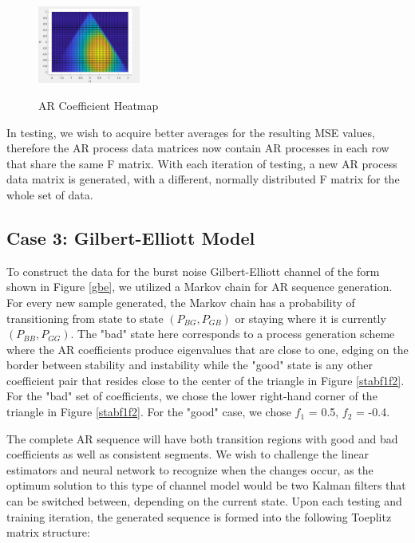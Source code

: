 \documentclass[twocolumn,letterpaper]{IEEEAerospaceCLS}  %
\begin{document}
\begin{figure}[!h]
\centering\includegraphics[width=0.3\textwidth]{figs/heatmap.PNG}\\
\caption{AR Coefficient Heatmap}
\label{heatmap}
\end{figure}

In testing, we wish to acquire better averages for the resulting MSE values, therefore the AR process data matrices now contain AR processes in each row that share the same F matrix. With each iteration of testing, a new AR process data matrix is generated, with a different, normally distributed F matrix for the whole set of data.  

\subsection{Case 3: Gilbert-Elliott Model}

To construct the data for the burst noise Gilbert-Elliott channel of the form shown in Figure \ref{gbe}, we utilized a Markov chain for AR sequence generation. For every new sample generated, the Markov chain has a probability of transitioning from state to state $(P_{BG}, P_{GB})$ or staying where it is currently $(P_{BB}, P_{GG})$. The "bad" state here corresponds to a process generation scheme where the AR coefficients produce eigenvalues that are close to one, edging on the border between stability and instability while the "good" state is any other coefficient pair that resides close to the center of the triangle in Figure \ref{stabf1f2}. For the "bad" set of coefficients, we chose the lower right-hand corner of the triangle in Figure \ref{stabf1f2}. For the "good" case, we chose $f_1$ = 0.5, $f_2$ = -0.4.

The complete AR sequence will have both transition regions with good and bad coefficients as well as consistent segments. We wish to challenge the linear estimators and neural network to recognize when the changes occur, as the optimum solution to this type of channel model would be two Kalman filters that can be switched between, depending on the current state. Upon each testing and training iteration, the generated sequence is formed into the following Toeplitz matrix structure:
\end{document}
